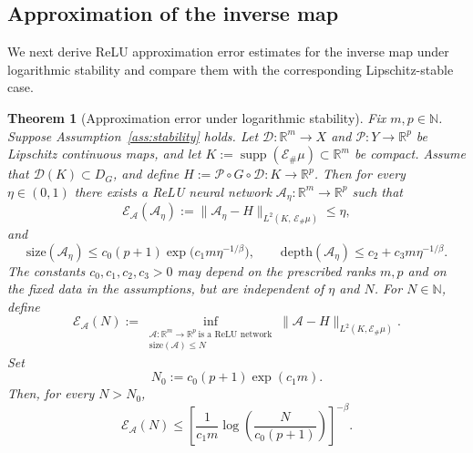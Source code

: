 \documentclass{article}
\numberwithin{equation}{section}
\theoremstyle{plain}
\newtheorem{theorem}{Theorem}[section]
\newcommand{\supp}{\operatorname{supp}}
\begin{document}
	\subsection{Approximation of the inverse map}
	We next derive ReLU approximation error estimates for the inverse map under logarithmic stability and compare them with the corresponding Lipschitz-stable case.
	\begin{theorem}[Approximation error under logarithmic stability]\label{thm:abstract-approximation}
		Fix $m,p\in\mathbb N$. Suppose Assumption~\ref{ass:stability} holds. Let $\mathcal D:\mathbb R^m\to X$ and $\mathcal P:Y\to\mathbb R^p$ be Lipschitz continuous maps, and let $K:=\supp(\mathcal E_\#\mu)\subset \mathbb R^m$ be compact. Assume that $\mathcal D(K)\subset D_G$, and define $H:=\mathcal P\circ G\circ\mathcal D:K\to \mathbb R^p$.
		Then for every $\eta\in(0,1)$ there exists a ReLU neural network $\mathcal A_\eta:\mathbb R^m\to \mathbb R^p$
		such that
		\begin{equation*}
			\mathscr{E}_{\mathcal{A}}(\mathcal A_\eta)
			:=\|\mathcal A_\eta - H\|_{L^{2}(K,\,\mathcal{E}_{\#}\mu)}
			\le\eta,
		\end{equation*}
		and
		\begin{equation*}
			\mathrm{size}(\mathcal A_\eta)
			\le c_0(p+1)\exp \bigl(c_1m\eta^{-1/\beta}\bigr),
			\qquad
			\mathrm{depth}(\mathcal A_\eta)
			\le c_2+c_3m\eta^{-1/\beta}.
		\end{equation*}
		The constants $c_0,c_1,c_2,c_3>0$ may depend on the prescribed ranks $m,p$ and on the fixed data in the assumptions, but are independent of $\eta$ and $N$.
		For $N\in\mathbb N$, define
		\begin{equation*}
			\mathscr E_{\mathcal A}(N)
			:=
			\inf_{\substack{\mathcal A:\mathbb R^m\to\mathbb R^p\ \text{is a ReLU network}\\
			\mathrm{size}(\mathcal A)\le N}}
			\|\mathcal A-H\|_{L^2(K,\mathcal E_\#\mu)}.
		\end{equation*}
		Set
		\begin{equation*}
			N_0:=c_0(p+1)\exp(c_1m).
		\end{equation*}
		Then, for every $N> N_0$,
		\begin{equation*}
			\mathscr E_{\mathcal A}(N)
			\le
			\left[
			\frac{1}{c_1m}
			\log\!\left(\frac{N}{c_0(p+1)}\right)
			\right]^{-\beta}.
		\end{equation*}
	\end{theorem}
	
\end{document}
